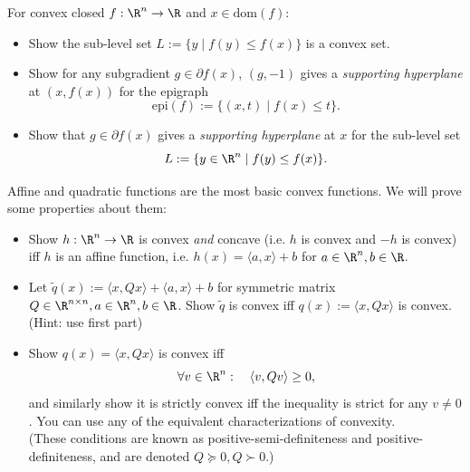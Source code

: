 \documentclass[addpoints,12pt,A4]{exam}
\begin{document}
\begin{questions}
\begin{solution}
\end{solution}





\question
For convex closed $f : \R^{n} \to \R$ and $x \in \text{dom}(f)$:
\begin{itemize}
    \item Show the sub-level set $L := \{y \mid f(y) \leq f(x)\}$ is a convex set. 
    \item Show for any subgradient $g \in \partial f(x)$, $(g, -1)$ gives a \emph{supporting hyperplane} at $(x,f(x))$ for the epigraph
    \[ \text{epi}(f) := \{ (x, t) \mid f(x) \leq t \} .   \]
    \item Show that $g \in \partial f(x)$ gives a \emph{supporting hyperplane} at $x$ for the sub-level set
\[ L := \{ y \in \R^{n} \mid f(y) \leq f(x) \} .   \]
\end{itemize}

\begin{solution}

\end{solution}


\question
Affine and quadratic functions are the most basic convex functions. We will prove some properties about them:
\begin{itemize}
    \item Show $h : \R^{n} \to \R$ is convex \emph{and} concave (i.e. $h$ is convex and $-h$ is convex) iff $h$ is an affine function, i.e. $h(x) = \langle a, x \rangle + b$ for $a \in \R^{n}, b \in \R$.
    
    \item Let $\tilde{q}(x) := \langle x, Q x \rangle + \langle a, x \rangle + b$ for symmetric matrix $Q \in \R^{n \times n}, a \in \R^{n}, b \in \R$. Show $\tilde{q}$ is convex iff $q(x) := \langle x, Q x \rangle$ is convex. (Hint: use first part)
    
    \item Show $q(x) = \langle x, Q x \rangle$ is convex iff 
    \[ \forall v \in \R^{n}: \quad \langle v, Q v \rangle \geq 0 ,   \]
    and similarly show it is strictly convex iff the inequality is strict for any $v \neq 0$. You can use any of the equivalent characterizations of convexity.
    \\ (These conditions are known as positive-semi-definiteness and positive-definiteness, and are denoted $Q \succeq 0, Q \succ 0$.)


\end{itemize}
\end{questions}
\end{document}

